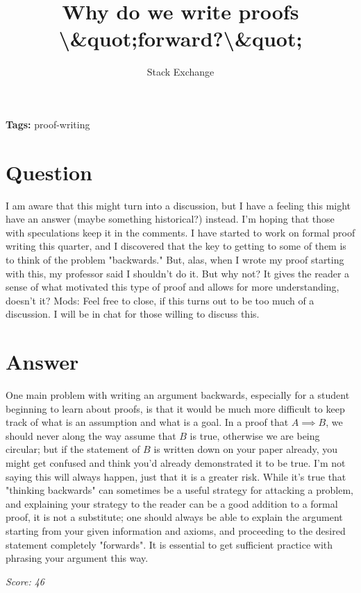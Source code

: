 \documentclass{article}
\title{Why do we write proofs \textbackslash{}&quot;forward?\textbackslash{}&quot;}
\author{Stack Exchange}
\date{}
\begin{document}
\maketitle

\noindent\textbf{Tags:} proof-writing

\section*{Question}
I am aware that this might turn into a discussion, but I have a feeling this might have an answer (maybe something historical?) instead. I'm hoping that those with speculations keep it in the comments. I have started to work on formal proof writing this quarter, and I discovered that the key to getting to some of them is to think of the problem "backwards." But, alas, when I wrote my proof starting with this, my professor said I shouldn't do it. But why not? It gives the reader a sense of what motivated this type of proof and allows for more understanding, doesn't it? Mods: Feel free to close, if this turns out to be too much of a discussion. I will be in chat for those willing to discuss this.

\section*{Answer}
One main problem with writing an argument backwards, especially for a student beginning to learn about proofs, is that it would be much more difficult to keep track of what is an assumption and what is a goal. In a proof that $A\implies B$, we should never along the way assume that $B$ is true, otherwise we are being circular; but if the statement of $B$ is written down on your paper already, you might get confused and think you'd already demonstrated it to be true. I'm not saying this will always happen, just that it is a greater risk. While it's true that "thinking backwards" can sometimes be a useful strategy for attacking a problem, and explaining your strategy to the reader can be a good addition to a formal proof, it is not a substitute; one should always be able to explain the argument starting from your given information and axioms, and proceeding to the desired statement completely "forwards". It is essential to get sufficient practice with phrasing your argument this way.

\vspace{1em}
\noindent\textit{Score: 46}
\end{document}
